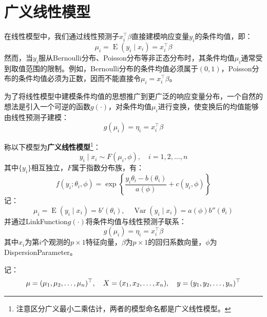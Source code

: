 \section{广义线性模型}
在线性模型中，我们通过线性预测子$x_i^{\top}\beta$直接建模响应变量$y_i$的条件均值，即：
\begin{equation*}
	\mu_i=\operatorname{E}(y_i\mid x_i)=x_i^{\top}\beta
\end{equation*}
然而，当$y_i$服从Bernoulli分布、Poisson分布等非正态分布时，其条件均值$\mu_i$通常受到取值范围的限制。例如，Bernoulli分布的条件均值必须属于$(0,1)$，Poisson分布的条件均值必须为正数，因而不能直接令$\mu_i=x_i^{\top}\beta$。\par
为了将线性模型中建模条件均值的思想推广到更广泛的响应变量分布，一个自然的想法是引入一个可逆的函数$g(\cdot)$，对条件均值$\mu_i$进行变换，使变换后的均值能够由线性预测子建模：
\begin{equation*}
	g(\mu_i)=\eta_i=x_i^{\top}\beta
\end{equation*}
\begin{definition}\label{model:GLM}
	称以下模型为\textbf{广义线性模型}\footnote{注意区分广义最小二乘估计，两者的模型命名都是广义线性模型。}：
	\begin{equation*}
		y_i\mid x_i\sim F(\mu_i,\phi), \quad i=1,2,\dots,n
	\end{equation*}
	其中$\{y_i\}$相互独立，$F$属于指数分布族，有：
	\begin{equation*}
		f(y_i;\theta_i,\phi)=\exp\left\{\frac{y_i\theta_i-b(\theta_i)}{a(\phi)}+c(y_i,\phi)\right\}
	\end{equation*}
	记：
	\begin{equation*}
		\mu_i=\operatorname{E}(y_i\mid x_i)=b'(\theta_i), \quad\operatorname{Var}(y_i\mid x_i)=a(\phi)b''(\theta_i)
	\end{equation*}
	并通过\gls{LinkFunction}$g(\cdot)$将条件均值与线性预测子联系：
	\begin{equation*}
		g(\mu_i)=\eta_i=x_i^{\top}\beta
	\end{equation*}
	其中$x_i$为第$i$个观测的$p\times1$特征向量，$\beta$为$p\times1$的回归系数向量，$\phi$为\gls{DispersionParameter}。\par
	记：
	\begin{equation*}
		\mu=(\mu_1, \mu_2, \dots, \mu_{n})^{\top},\quad X=(x_1, x_2, \dots, x_{n}),\quad y=(y_1, y_2, \dots, y_{n})^{\top}
	\end{equation*}
\end{definition}

